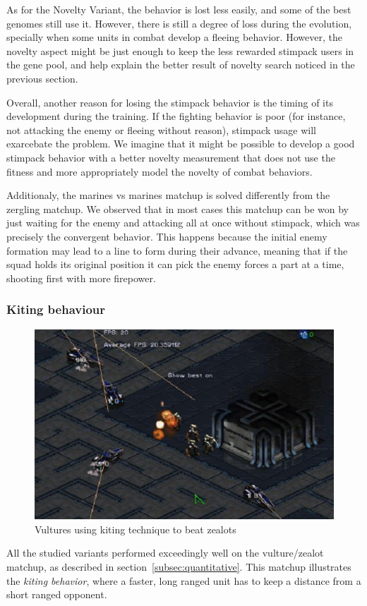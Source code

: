 As for the Novelty Variant, the behavior is lost less easily, and some
of the best genomes still use it. However, there is still a degree
of loss during the evolution, specially when some units in combat develop
a fleeing behavior. However, the novelty aspect might be just enough to
keep the less rewarded stimpack users in the gene pool, and help explain the
better result of novelty search noticed in the previous section.

Overall, another reason for losing the stimpack behavior is the timing
of its development during the training. If the fighting behavior is
poor (for instance, not attacking the enemy or fleeing without
reason), stimpack usage will exarcebate the problem. We imagine that
it might be possible to develop a good stimpack behavior with a better
novelty measurement that does not use the fitness and more
appropriately model the novelty of combat behaviors.

Additionaly, the marines vs marines matchup is solved differently from
the zergling matchup. We observed that in most cases this matchup can
be won by just waiting for the enemy and attacking all at once without
stimpack, which was precisely the convergent behavior. This happens
because the initial enemy formation may lead to a line to form during
their advance, meaning that if the squad holds its original position
it can pick the enemy forces a part at a time, shooting first with
more firepower.

\subsubsection{Kiting behaviour}

\begin{figure}
    \includegraphics[width=.45\textwidth]{figures/vultures_kiting_screenshot}
    \caption{Vultures using kiting technique to beat
      zealots}\label{fig:vultures_kiting}
\end{figure}

All the studied variants performed exceedingly well on the
vulture/zealot matchup, as described in
section~\ref{subsec:quantitative}. This matchup illustrates the
\emph{kiting behavior}, where a faster, long ranged unit has to keep a
distance from a short ranged opponent.


